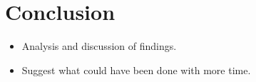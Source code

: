
\section{Conclusion}

\begin{itemize}
    \item Analysis and discussion of findings.
    \item Suggest what could have been done with more time.
\end{itemize}